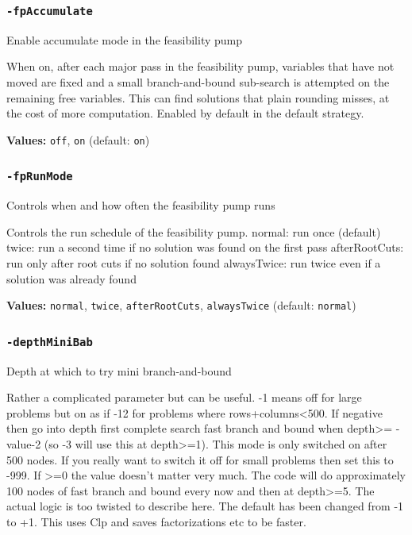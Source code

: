 \documentclass[11pt,a4paper]{article}
\begin{document}
\subsubsection*{\texttt{-fpAccumulate}}

Enable accumulate mode in the feasibility pump

When on, after each major pass in the feasibility pump, variables that have not moved are fixed and a small branch-and-bound sub-search is attempted on the remaining free variables. This can find solutions that plain rounding misses, at the cost of more computation. Enabled by default in the default strategy.

\textbf{Values:} \texttt{off}, \texttt{on} (default: \texttt{on})

\subsubsection*{\texttt{-fpRunMode}}

Controls when and how often the feasibility pump runs

Controls the run schedule of the feasibility pump.
  normal: run once (default)
  twice: run a second time if no solution was found on the first pass
  afterRootCuts: run only after root cuts if no solution found
  alwaysTwice: run twice even if a solution was already found

\textbf{Values:} \texttt{normal}, \texttt{twice}, \texttt{afterRootCuts}, \texttt{alwaysTwice} (default: \texttt{normal})

\subsubsection*{\texttt{-depthMiniBab}}

Depth at which to try mini branch-and-bound

Rather a complicated parameter but can be useful. -1 means off for large problems but on as if -12 for problems where rows+columns<500. If negative then go into depth first complete search fast branch and bound when depth>= -value-2 (so -3 will use this at depth>=1).  This mode is only switched on after 500 nodes.  If you really want to switch it off for small problems then set this to -999.  If >=0 the value doesn't matter very much.  The code will do approximately 100 nodes of fast branch and bound every now and then at depth>=5. The actual logic is too twisted to describe here. The default has been changed from -1 to +1.  This uses Clp and saves factorizations etc to be faster.
\end{document}

